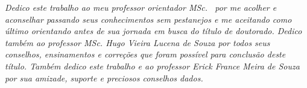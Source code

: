 \begin{dedicatoria}
	\vspace*{\fill}
		\centering
		\noindent
		\textit{ 
			Dedico este trabalho ao meu professor orientador MSc. \imprimirorientador\ por me acolher e aconselhar passando seus conhecimentos sem pestanejos e me aceitando como último orientando antes de sua jornada em busca do título de doutorado. Dedico também ao professor MSc. Hugo Vieira Lucena de Souza por todos seus conselhos, ensinamentos e correções que foram possível para conclusão deste título. Também dedico este trabalho e ao professor Erick France Meira de Souza por sua amizade, suporte e preciosos conselhos dados.
		} \vspace*{\fill}
\end{dedicatoria}
